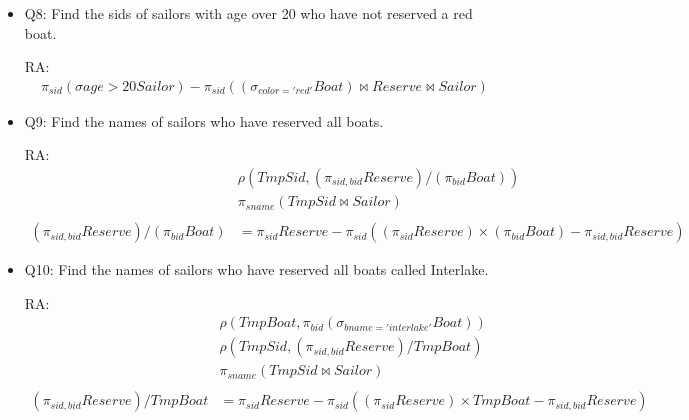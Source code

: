 \documentclass[10pt]{article}
\begin{document}
\begin{itemize}
\item Q8: Find the sids of sailors with age over 20 who have not
  reserved a red boat.

  RA:
  \begin{align*}
    \pi_{sid}(\sigma{age>20}Sailor) -
    \pi_{sid}((\sigma_{color='red'}Boat) \bowtie Reserve \bowtie Sailor)
  \end{align*}

\item Q9: Find the names of sailors who have reserved all boats.

  RA:
  \begin{align*}
    &\rho(TmpSid, (\pi_{sid,bid}Reserve) / (\pi_{bid}Boat))\\
    &\pi_{sname}(TmpSid \bowtie Sailor)\\\\
    (\pi_{sid,bid}Reserve) / (\pi_{bid}Boat) &=
    \pi_{sid}Reserve - \pi_{sid}((\pi_{sid}Reserve) \times
    (\pi_{bid}Boat) - \pi_{sid,bid}Reserve)
  \end{align*}

\item Q10: Find the names of sailors who have reserved all boats
  called Interlake.

  RA:
  \begin{align*}
    &\rho(TmpBoat, \pi_{bid}(\sigma_{bname='interlake'}Boat))\\
    &\rho(TmpSid, (\pi_{sid,bid}Reserve) / TmpBoat)\\
    &\pi_{sname}(TmpSid \bowtie Sailor)\\\\
    (\pi_{sid,bid}Reserve) / TmpBoat &=
    \pi_{sid}Reserve - \pi_{sid}((\pi_{sid}Reserve) \times
    TmpBoat - \pi_{sid,bid}Reserve)
  \end{align*}


\end{itemize}
\end{document}
